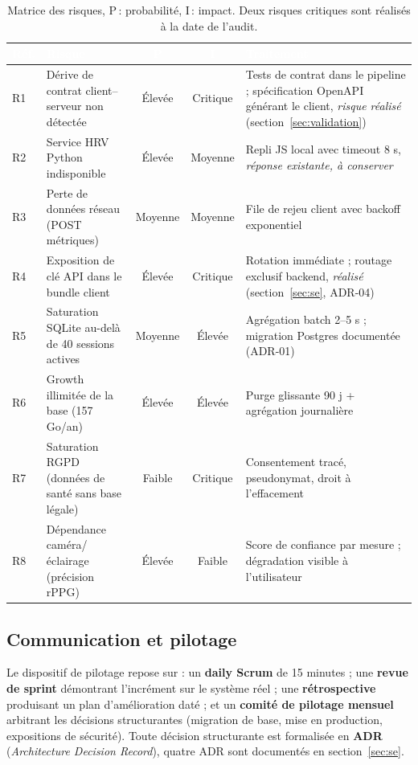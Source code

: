 \documentclass[11pt,a4paper]{article}
\begin{document}
\begin{table}[H]
\centering\small
\begin{tabularx}{\linewidth}{>{\raggedright\arraybackslash}p{0.8cm} p{4.9cm} c c p{4.9cm}}
\toprule
\rowcolor{cwblue} \textcolor{white}{\bf Réf.} & \textcolor{white}{\bf Risque} & \textcolor{white}{\bf P} &
\textcolor{white}{\bf I} & \textcolor{white}{\bf Traitement} \\
\midrule
R1 & Dérive de contrat client--serveur non détectée & Élevée & Critique & Tests de contrat dans le
 pipeline ; spécification OpenAPI générant le client, \textit{risque réalisé} (section~\ref{sec:validation}) \\
R2 & Service HRV Python indisponible & Élevée & Moyenne & Repli JS local avec timeout 8 s,
\textit{réponse existante, à conserver} \\
R3 & Perte de données réseau (POST métriques) & Moyenne & Moyenne & File de rejeu client avec backoff
 exponentiel \\
R4 & Exposition de clé API dans le bundle client & Élevée & Critique & Rotation immédiate ; routage
 exclusif backend, \textit{réalisé} (section~\ref{sec:se}, ADR-04) \\
R5 & Saturation SQLite au-delà de 40 sessions actives & Moyenne & Élevée & Agrégation batch 2--5 s ;
 migration Postgres documentée (ADR-01) \\
R6 & Growth illimitée de la base (157 Go/an) & Élevée & Élevée & Purge glissante 90 j + agrégation
 journalière \\
R7 & Saturation RGPD (données de santé sans base légale) & Faible & Critique & Consentement tracé,
 pseudonymat, droit à l'effacement \\
R8 & Dépendance caméra/éclairage (précision rPPG) & Élevée & Faible & Score de confiance par mesure ;
 dégradation visible à l'utilisateur \\
\bottomrule
\end{tabularx}
\caption{Matrice des risques, P\,: probabilité, I\,: impact. Deux risques critiques sont réalisés à la
date de l'audit.}
\label{tab:risques}
\end{table}

\subsection{Communication et pilotage}
Le dispositif de pilotage repose sur : un \textbf{daily Scrum} de 15 minutes ; une \textbf{revue de
sprint} démontrant l'incrément sur le système réel ; une \textbf{rétrospective} produisant un plan
d'amélioration daté ; et un \textbf{comité de pilotage mensuel} arbitrant les décisions structurantes
(migration de base, mise en production, expositions de sécurité). Toute décision structurante est
formalisée en \textbf{ADR} (\textit{Architecture Decision Record}), quatre ADR sont documentés en
section~\ref{sec:se}.
\end{document}
